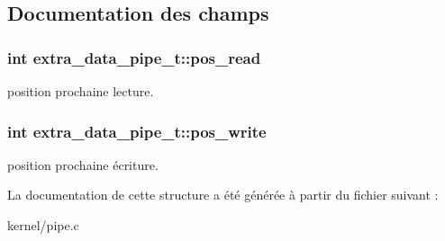 \subsection{Documentation des champs}
\hypertarget{structextra__data__pipe__t_ab5099bb3254b99c3601d267528cd4dc1}{
\subsubsection[{pos\+\_\+read}]{\setlength{\rightskip}{0pt plus 5cm}int extra\+\_\+data\+\_\+pipe\+\_\+t\+::pos\+\_\+read}}\label{structextra__data__pipe__t_ab5099bb3254b99c3601d267528cd4dc1}
position prochaine lecture. \hypertarget{structextra__data__pipe__t_a78f132f3076f0dc6ad7473d9361476c9}{
\subsubsection[{pos\+\_\+write}]{\setlength{\rightskip}{0pt plus 5cm}int extra\+\_\+data\+\_\+pipe\+\_\+t\+::pos\+\_\+write}}\label{structextra__data__pipe__t_a78f132f3076f0dc6ad7473d9361476c9}
position prochaine écriture. 

La documentation de cette structure a été générée à partir du fichier suivant \+:\begin{DoxyCompactItemize}
\item 
kernel/pipe.\+c\end{DoxyCompactItemize}
